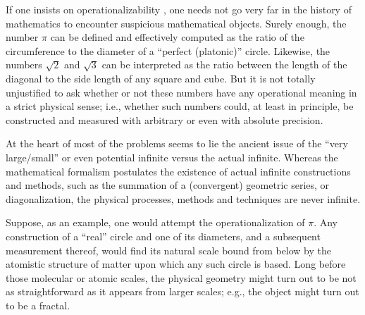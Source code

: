 \documentclass[12pt]{article}
\begin{document}
If one insists on operationalizability
\cite{bridgman},
one needs not go very far in the history of mathematics to encounter
suspicious mathematical objects.
Surely enough, the number $\pi$ can be defined and effectively computed as the ratio of the
circumference to the diameter of a ``perfect (platonic)'' circle.
Likewise, the numbers $\sqrt{2}$ and $\sqrt{3}$ can be interpreted as the ratio
between the length of the diagonal to
the side length of any square and cube.
But it is not totally unjustified to ask whether or not these numbers have
any operational meaning
in a strict physical sense; i.e., whether such numbers could, at least in
principle, be constructed and measured with arbitrary or even with absolute
precision.

At the heart of most of the problems seems to lie the ancient issue of the ``very large/small'' or even potential
infinite versus the actual infinite.
Whereas the mathematical formalism postulates the existence of  actual
infinite constructions and methods,
such as the summation of a (convergent) geometric series, or diagonalization,
the physical processes, methods and techniques are never infinite.

Suppose, as an example, one would attempt the operationalization of $\pi$.
Any construction of a ``real'' circle and one of its diameters, and a
subsequent measurement thereof,
would find its natural scale bound from below by the atomistic structure of
matter upon which any such  circle
is based.
Long before those molecular or atomic scales,
the physical geometry might turn out to be not as straightforward as it
appears from
larger scales; e.g., the object might turn out to be a fractal.
\end{document}
